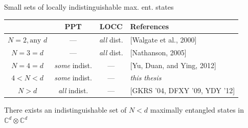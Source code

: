 \documentclass{beamer}
\def\complex{\mathbb{C}}
\begin{document}
 
    \begin{frame}[t]{Small sets of locally indistinguishable max. ent. states}
        \begin{table}[!ht]
        \centering
        \def\arraystretch{1.5}
        \begin{tabular}{|c|c|c|p{4.3cm}|}
          \hline
            & PPT & LOCC & References\\
          \hline \hline
          $N = 2, \text{any }d$     & --- & \emph{all} dist. & [Walgate et al., 2000]\\
          \hline
          $N = 3 = d$ & --- & \emph{all} dist. & [Nathanson, 2005]\\
          \hline 
          $N = 4 = d$ & \emph{some} indist. & --- & [Yu, Duan, and Ying, 2012]\\
          \hline
          \rowcolor{Gray}
          $4 < N < d$ & \emph{some} indist. & --- & \emph{this thesis}\\
          \hline
          $N > d$     & \emph{all} indist. & --- & [GKRS '04, DFXY '09, YDY '12] \\
          \hline
        \end{tabular}
        \end{table}
        \begin{theorem}[new]
            There exists an indistinguishable set of $N < d$ maximally entangled states in 
            $\complex^{d}\otimes\complex^{d}$
        \end{theorem}
    \end{frame}
\end{document}
